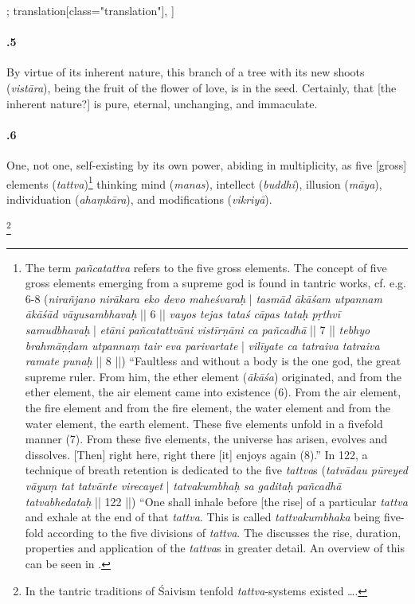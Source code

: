 \begin{alignment}[
  texts=edition[class="edition"];
  translation[class="translation"],
  ]
\begin{translation}
\begin{tlate}[21_5]
      \paragraph{.5} By virtue of its inherent nature, this branch of a tree with its new shoots (\textit{vistāra}), being the fruit of the flower of love, is in the seed. Certainly, that [the inherent nature?] is pure, eternal, unchanging, and immaculate.
    \end{tlate}
    \begin{tlate}[21_6]
     \paragraph{.6} One, not one, self-existing by its own power, abiding in multiplicity, as five [gross] elements (\textit{tattva})\footnote{The term \textit{pañcatattva} refers to the five gross elements. The concept of five gross elements emerging from a supreme god is found in tantric works, cf. e.g.  6-8 (\textit{nirañjano nirākara eko devo maheśvaraḥ} | \textit{tasmād ākāśam utpannam ākāśād vāyusambhavaḥ} || 6 || \textit{vayos tejas tataś cāpas tataḥ pṛthvī samudbhavaḥ} | \textit{etāni pañcatattvāni vistīrṇāni ca pañcadhā} || 7 || \textit{tebhyo brahmāṇḍam utpannaṃ tair eva parivartate} | \textit{vilīyate ca tatraiva tatraiva ramate punaḥ} || 8 ||) 
       ``Faultless and without a body is the one god, the great supreme ruler. From him, the ether element (\textit{ākāśa}) originated, and from the ether element, the air element came into existence (6). From the air element, the fire element and from the fire element, the water element and from the water element, the earth element. These five elements unfold in a fivefold manner (7). From these five elements, the universe has arisen, evolves and dissolves. [Then] right here, right there [it] enjoys again (8).'' In  122, a technique of breath retention is dedicated to the five \textit{tattva}s (\textit{tatvādau pūreyed vāyuṃ tat tatvānte virecayet} | \textit{tatvakumbhaḥ sa gaditaḥ pañcadhā tatvabhedataḥ} || 122 ||) ``One shall inhale before [the rise] of a particular \textit{tattva} and exhale at the end of that \textit{tattva}. This is called \textit{tattvakumbhaka} being five-fold according to the five divisions of \textit{tattva}. The  discusses the rise, duration, properties and application of the \textit{tattva}s in greater detail. An overview of this can be seen in \citeauthor[2021: Appendix-]{kumbhaka}.} thinking mind (\textit{manas}), intellect (\textit{buddhi}), illusion (\textit{māya}), individuation (\textit{ahaṃkāra}), and modifications (\textit{vikriyā}).\begin{buber}[f21_1]\footnote{In the tantric traditions of Śaivism tenfold \textit{tattva}-systems existed \ldots.}\end{buber}
   \end{tlate}
   \begin{tlate}[21_7]

\end{tlate}
\end{translation}
\end{alignment}
